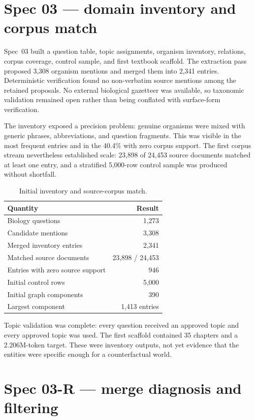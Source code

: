 \documentclass[11pt]{article}
\begin{document}
\section{Spec 03 --- domain inventory and corpus match}

Spec~03 built a question table, topic assignments, organism inventory,
relations, corpus coverage, control sample, and first textbook scaffold. The
extraction pass proposed 3,308 organism mentions and merged them into 2,341
entries. Deterministic verification found no non-verbatim source mentions among
the retained proposals. No external biological gazetteer was available, so
taxonomic validation remained open rather than being conflated with surface-form
verification.

The inventory exposed a precision problem: genuine organisms were mixed with
generic phrases, abbreviations, and question fragments. This was visible in the
most frequent entries and in the 40.4\% with zero corpus support. The first
corpus stream nevertheless established scale: 23,898 of 24,453 source documents
matched at least one entry, and a stratified 5,000-row control sample was
produced without shortfall.

\begin{table}[h]
\centering
\begin{tabular}{lr}
\toprule
Quantity & Result \\
\midrule
Biology questions & 1,273 \\
Candidate mentions & 3,308 \\
Merged inventory entries & 2,341 \\
Matched source documents & 23,898 / 24,453 \\
Entries with zero source support & 946 \\
Initial control rows & 5,000 \\
Initial graph components & 390 \\
Largest component & 1,413 entries \\
\bottomrule
\end{tabular}
\caption{Initial inventory and source-corpus match.}
\end{table}

Topic validation was complete: every question received an approved topic and
every approved topic was used. The first scaffold contained 35 chapters and a
2.206M-token target. These were inventory outputs, not yet evidence that the
entities were specific enough for a counterfactual world.

\section{Spec 03-R --- merge diagnosis and filtering}
\end{document}

